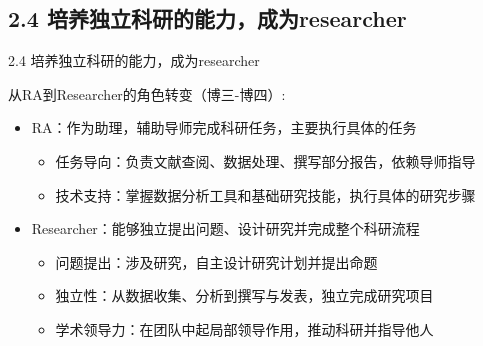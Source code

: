 \documentclass[10pt,aspectratio=43,mathserif,table]{beamer}
\begin{document}
\subsection{2.4 培养独立科研的能力，成为researcher}
\begin{frame}{\small 2.4 培养独立科研的能力，成为researcher}
	
	\begin{block}{\footnotesize 从RA到Researcher的角色转变（博三-博四）:}
	\begin{itemize}
		\item \footnotesize RA：作为助理，辅助导师完成科研任务，主要执行具体的任务
		\vspace{0.4em}
		\begin{itemize}
			\item \footnotesize 任务导向：负责文献查阅、数据处理、撰写部分报告，依赖导师指导
		\end{itemize}
		\vspace{0.4em}
		\begin{itemize}
			\item \footnotesize 技术支持：掌握数据分析工具和基础研究技能，执行具体的研究步骤
		\end{itemize}
		\vspace{0.9em}
		
		\item \footnotesize Researcher：能够独立提出问题、设计研究并完成整个科研流程
		\vspace{0.4em}
		\begin{itemize}
			\item \footnotesize 问题提出：涉及研究，自主设计研究计划并提出命题
		\end{itemize}
		\vspace{0.4em}
		\begin{itemize}
			\item \footnotesize 独立性：从数据收集、分析到撰写与发表，独立完成研究项目
		\end{itemize}
		\vspace{0.4em}
		\begin{itemize}
			\item \footnotesize 学术领导力：在团队中起局部领导作用，推动科研并指导他人
		\end{itemize}
		\vspace{0.4em}
		
	\end{itemize}
\end{block}
	
\end{frame}
\end{document}
